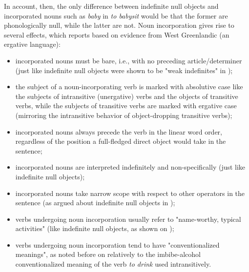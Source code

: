 In  account, then, the only difference between indefinite null objects and incorporated nouns such as \textit{baby} in \textit{to babysit} would be that the former are phonologically null, while the latter are not. Noun incorporation gives rise to several effects, which \textcite[455-456]{Marti2015} reports based on evidence from West Greenlandic (an ergative language):
\begin{itemize}
    \item incorporated nouns must be bare, i.e., with no preceding article/determiner (just like indefinite null objects were shown to be "weak indefinites" in );
    \item the subject of a noun-incorporating verb is marked with absolutive case like the subjects of intransitive (unergative) verbs and the objects of transitive verbs, while the subjects of transitive verbs are marked with ergative case (mirroring the intransitive behavior of object-dropping transitive verbs);
    \item incorporated nouns always precede the verb in the linear word order, regardless of the position a full-fledged direct object would take in the sentence;
    \item incorporated nouns are interpreted indefinitely and non-specifically (just like indefinite null objects);
    \item incorporated nouns take narrow scope with respect to other operators in the sentence (as argued about indefinite null objects in );
    \item verbs undergoing noun incorporation usually refer to "name-worthy, typical activities" (like indefinite null objects, as shown on );
    \item verbs undergoing noun incorporation tend to have "conventionalized meanings", as noted before on  relatively to the imbibe-alcohol conventionalized meaning of the verb \textit{to drink} used intransitively.
\end{itemize}

